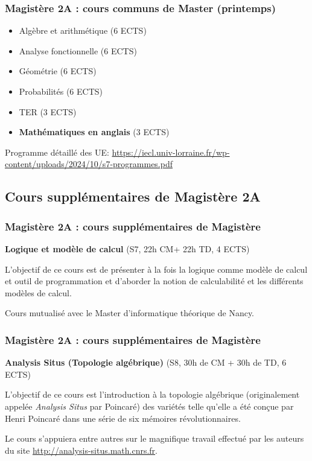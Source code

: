 \documentclass[slidetop,11pt]{beamer}
\begin{document}
\begin{frame}
\frametitle{Magistère 2A : cours communs de Master (printemps)}
\begin{itemize}
\item Algèbre et arithmétique (6 ECTS)
\item Analyse fonctionnelle (6 ECTS)
\item Géométrie (6 ECTS)
\item Probabilités (6 ECTS)
\item TER (3 ECTS)
\item \textbf{Mathématiques en anglais} (3 ECTS)
\end{itemize}


\bigskip
Programme détaillé des UE: 
\url{https://iecl.univ-lorraine.fr/wp-content/uploads/2024/10/s7-programmes.pdf}
\end{frame}

\subsection{Cours supplémentaires de Magistère 2A}

\begin{frame}
\frametitle{Magistère 2A : cours supplémentaires de Magistère}

\textbf{Logique et modèle de calcul }
(S7, 22h CM+ 22h TD, 4 ECTS)

L'objectif de ce cours est de présenter à la fois la logique comme modèle de calcul et outil de programmation et d'aborder la notion de calculabilité et les différents modèles de calcul. 

Cours mutualisé avec le Master d'informatique théorique de Nancy.

\end{frame}


\begin{frame}
\frametitle{Magistère 2A : cours supplémentaires de Magistère}

\textbf{Analysis Situs (Topologie algébrique)}
(S8, 30h de CM + 30h de TD, 6 ECTS)

\bigskip
L'objectif de ce cours est l'introduction à la topologie algébrique (originalement appelée \textit{Analysis Situs} par Poincaré) des variétés telle qu'elle a été conçue par Henri Poincaré dans une série de six mémoires révolutionnaires.

Le cours s'appuiera entre autres sur le magnifique travail effectué par les auteurs du site  \url{http://analysis-situs.math.cnrs.fr}.


\end{frame}
\end{document}
